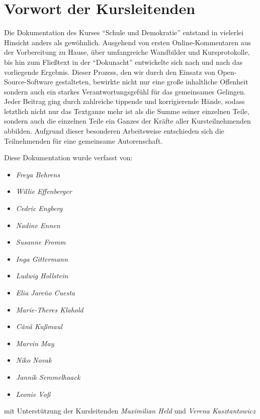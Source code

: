 \section[Vorwort]{Vorwort der Kursleitenden}

Die Dokumentation des Kurses ``Schule und Demokratie'' entstand in vielerlei Hinsicht anders als gewöhnlich.
Ausgehend von ersten Online-Kommentaren aus der Vorbereitung zu Hause, über umfangreiche Wandbilder und Kursprotokolle, bis hin zum Fließtext in der ``Dokunacht'' entwickelte sich nach und nach das vorliegende Ergebnis.
Dieser Prozess, den wir durch den Einsatz von Open-Source-Software gestalteten, bewirkte nicht nur eine große inhaltliche Offenheit sondern auch ein starkes Verantwortungsgefühl für das gemeinsames Gelingen.
Jeder Beitrag ging durch zahlreiche tippende und korrigierende Hände, sodass letztlich nicht nur das Textganze mehr ist als die Summe seiner einzelnen Teile, sondern auch die einzelnen Teile ein Ganzes der Kräfte aller Kursteilnehmenden abbilden.
Aufgrund dieser besonderen Arbeitsweise entschieden sich die Teilnehmenden für eine gemeinsame Autorenschaft.

Diese Dokumentation wurde verfasst von:

\begin{itemize}
	\item[] \emph{Freya Behrens}
	\item[] \emph{Willie Effenberger}
	\item[] \emph{Cedric Engberg}
	\item[] \emph{Nadine Ennen}
	\item[] \emph{Susanne Fromm}
	\item[] \emph{Inga Gittermann}
	\item[] \emph{Ludwig Hollstein}
	\item[] \emph{Elia Jareño Cuesta}
	\item[] \emph{Marie-Theres Klahold}
	\item[] \emph{Cânâ Kußmaul}
	\item[] \emph{Marvin May}
	\item[] \emph{Niko Novak}
	\item[] \emph{Jannik Semmelhaack}
	\item[] \emph{Leonie Voß}
\end{itemize}

mit Unterstützung der Kursleitenden \emph{Maximilian Held} und \emph{Verena Kasztantowicz}